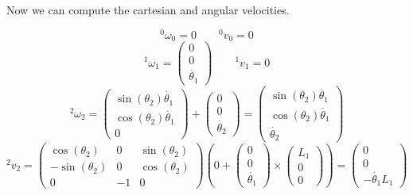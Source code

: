 \documentclass[10pt,a4paper]{article}
\begin{document}
Now we can compute the cartesian and angular velocities.

\begin{equation*}
  {}^{0}\omega_{0} = 0 \qquad {}^{0}v_{0} = 0
\end{equation*}
\begin{equation*}
  {}^{1}\omega_{1} = \begin{pmatrix}
    0\\0\\\dot{\theta_{1}}
  \end{pmatrix} \qquad {}^{1}v_{1} = 0
\end{equation*}
\begin{equation*}
  {}^{2}\omega_{2} = \begin{pmatrix}
    \sin(\theta_{2})\dot{\theta_{1}} \\ \cos(\theta_{2})\dot{\theta_{1}} \\ 0
  \end{pmatrix} + \begin{pmatrix}
    0\\0\\\dot{\theta_{2}}
  \end{pmatrix} = \begin{pmatrix}
    \sin(\theta_{2})\dot{\theta_{1}} \\ \cos(\theta_{2})\dot{\theta_{1}} \\ \dot{\theta_{2}}
  \end{pmatrix}
\end{equation*}
\begin{equation*}
  {}^{2}v_{2} = \begin{pmatrix}
    \cos(\theta_{2}) & 0 & \sin(\theta_{2})\\
    -\sin(\theta_{2}) & 0 & \cos(\theta_{2})\\
    0 & -1 & 0
  \end{pmatrix} \left( 0 + \begin{pmatrix}
      0\\0\\\dot{\theta_{1}}
    \end{pmatrix} \times \begin{pmatrix}
      L_{1}\\0\\0
    \end{pmatrix} \right) =
  \begin{pmatrix}
    0\\0\\-\dot{\theta_{1}}L_{1}
  \end{pmatrix}
\end{equation*}
\end{document}
